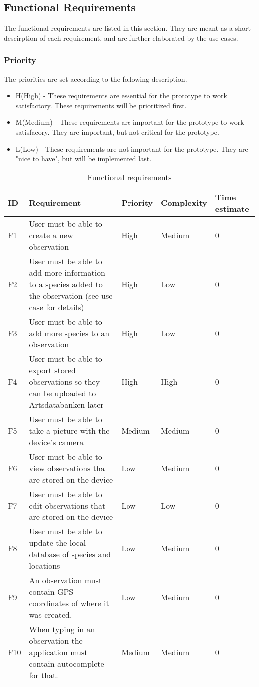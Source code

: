 \subsection{Functional Requirements}
The functional requirements are listed in this section. They are meant as a short descirption of each requirement, and are further elaborated by the use cases.

\subsubsection{Priority}
The priorities are set according to the following description.
\begin{itemize}
	 \item H(High) - These requirements are essential for the prototype to work satisfactory. These requirements will be prioritized first.
	\item M(Medium) - These requirements are important for the prototype to work satisfacory. They are important, but not critical for the prototype.
	\item L(Low) - These requirements are not important for the prototype. They are "nice to have", but will be implemented last.
\end{itemize}

\begin{table}
	\begin{tabular}[t]{|l|p{}|l|l|p{}|}\hline
	\bf ID&\bf Requirement& \bf Priority& \bf Complexity&\bf Time estimate\\\hline
	F1&User must be able to create a new observation &High&Medium&0\\\hline
	F2&User must be able to add more information to a species added to the observation (see use case for details) 	&High&Low&0\\\hline
	F3&User must be able to add more species to an observation &High&Low&0\\\hline
	F4&User must be able to export stored observations so they can be uploaded to Artsdatabanken later &High&High&0\\\hline
	F5&User must be able to take a picture with the device's camera &Medium&Medium&0\\\hline
	F6&User must be able to view observations tha are stored on the device &Low&Medium&0\\\hline
	F7&User must be able to edit observations that are stored on the device &Low&Low&0\\\hline
	F8&User must be able to update the local database of species and locations &Low&Medium&0\\\hline
	F9&An observation must contain GPS coordinates of where it was created. &Low&Medium&0\\\hline
	F10&When typing in an observation the application must contain autocomplete for that. &Medium&Medium&0\\\hline
	\end{tabular}
	\caption{Functional requirements}
	\label{funcreqs}
\end{table}
